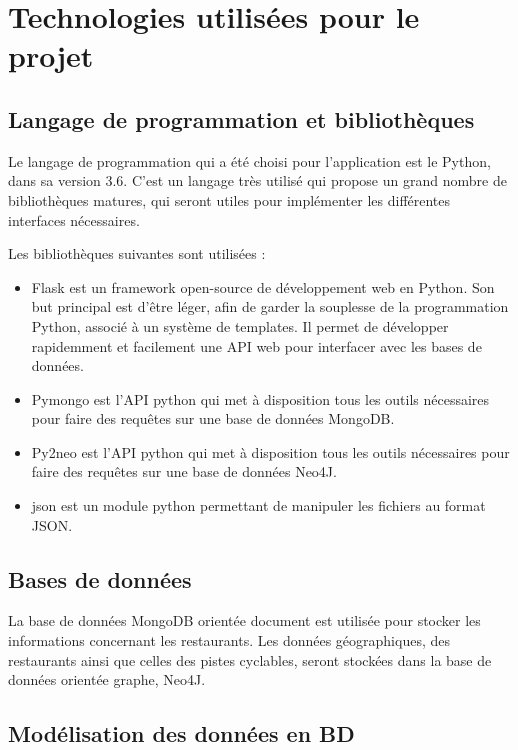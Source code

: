 \documentclass[12pt]{article}
\begin{document}
\section{Technologies utilisées pour le projet}

\subsection{Langage de programmation et bibliothèques}

    Le langage de programmation qui a été choisi pour l'application est le Python, dans sa version 3.6. C'est un langage très utilisé qui propose un grand nombre de bibliothèques matures, qui seront utiles pour implémenter les différentes interfaces nécessaires.

    Les bibliothèques suivantes sont utilisées :

    \begin{itemize}
        \item Flask est un framework open-source de développement web en Python. Son but principal est d'être léger, afin de garder la souplesse de la programmation Python, associé à un système de templates. Il permet de développer rapidemment et facilement une API web pour interfacer avec les bases de données.
        \item Pymongo est l'API python qui met à disposition tous les outils nécessaires pour faire des requêtes sur une base de données MongoDB.
        \item Py2neo est l'API python qui met à disposition tous les outils nécessaires pour faire des requêtes sur une base de données Neo4J.
        \item json est un module python permettant de manipuler les fichiers au format JSON. 
    \end{itemize}

\subsection{Bases de données}

    La base de données MongoDB orientée document est utilisée pour stocker les informations concernant les restaurants. Les données géographiques, des restaurants ainsi que celles des pistes cyclables, seront stockées dans la base de données orientée graphe, Neo4J.

\subsection{Modélisation des données en BD}
\end{document}
